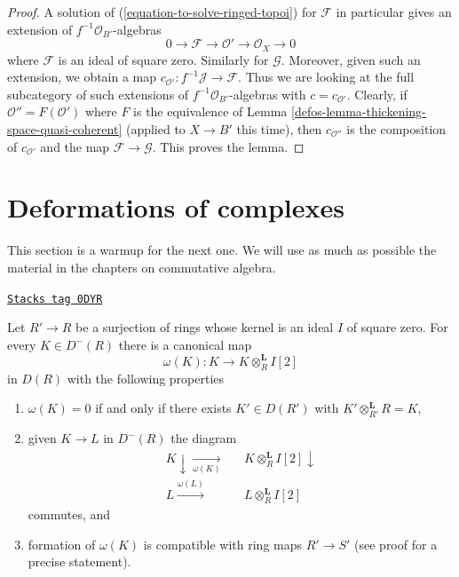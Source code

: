 \begin{proof}

A solution of (\ref{equation-to-solve-ringed-topoi}) for $\mathcal{F}$
in particular gives an extension of $f^{-1}\mathcal{O}_{B'}$-algebras
$$
0 \to \mathcal{F} \to \mathcal{O}' \to \mathcal{O}_X \to 0
$$
where $\mathcal{F}$ is an ideal of square zero. Similarly for $\mathcal{G}$.
Moreover, given such an extension, we obtain a map
$c_{\mathcal{O}'} : f^{-1}\mathcal{J} \to \mathcal{F}$.
Thus we are looking at the full subcategory of such extensions
of $f^{-1}\mathcal{O}_{B'}$-algebras with $c = c_{\mathcal{O}'}$.
Clearly, if $\mathcal{O}'' = F(\mathcal{O}')$ where
$F$ is the equivalence of Lemma \ref{defos-lemma-thickening-space-quasi-coherent}
(applied to $X \to B'$ this time),
then $c_{\mathcal{O}''}$ is the composition of
$c_{\mathcal{O}'}$ and the map $\mathcal{F} \to \mathcal{G}$.
This proves the lemma.
\end{proof}

\section{Deformations of complexes}
\label{defos-section-deformations-complexes}
This section is a warmup for the next one.
We will use as much as possible the material
in the chapters on commutative algebra.

\begin{lemma}
\label{defos-lemma-canonical-class-algebra}
\href{https://stacks.math.columbia.edu/tag/0DYR}{\texttt{Stacks tag 0DYR}}

Let $R' \to R$ be a surjection of rings whose kernel is an ideal
$I$ of square zero. For every $K \in D^-(R)$ there is a canonical
map
$$
\omega(K) : K \longrightarrow K \otimes_R^\mathbf{L} I[2]
$$
in $D(R)$ with the following properties
\begin{enumerate}
\item $\omega(K) = 0$ if and only if there exists
$K' \in D(R')$ with $K' \otimes_{R'}^\mathbf{L} R = K$,
\item given $K \to L$ in $D^-(R)$ the diagram
$$
\begin{array}{ccc}K \downarrow\underset{\omega(K)}{\longrightarrow} &  & K \otimes^\mathbf{L}_R I[2] \downarrow \\ L \overset{\omega(L)}{\longrightarrow} &  & L \otimes^\mathbf{L}_R I[2]\end{array}
$$
commutes, and
\item formation of $\omega(K)$ is compatible with ring maps $R' \to S'$
(see proof for a precise statement).
\end{enumerate}
\end{lemma}

